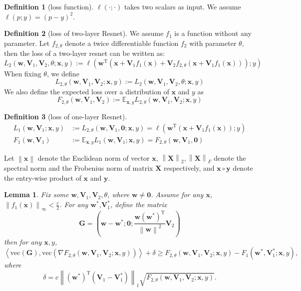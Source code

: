\documentclass{article}
\theoremstyle{plain}
\newtheorem{lem}{Lemma}
\theoremstyle{definition}
\newtheorem{defn}{Definition}
\newcommand{\norm}[1]{\left\lVert#1\right\rVert}
\newcommand{\iprod}[2]{\left\langle #1,#2 \right\rangle}
\begin{document}
\begin{defn}[loss function]
    $\ell(\cdot;\cdot)$ takes two scalars as input. We assume $\ell(p;y)=(p-y)^2$.
\end{defn}

\begin{defn}[loss of two-layer Resnet]
	We assume $f_1$ is a function without any parameter. Let $f_{2,\theta}$ denote a twice differentiable function $f_2$ with parameter $\theta$, then the loss of a two-layer resnet can be written as:
    \[L_2(\mathbf{w},\mathbf{V}_1,\mathbf{V}_2,\theta;\mathbf{x},y):=\ell\left(\mathbf{w}^\mathrm{T}(\mathbf{x}+\mathbf{V}_1f_1(\mathbf{x})+\mathbf{V}_2f_{2,\theta}(\mathbf{x}+\mathbf{V}_1f_1(\mathbf{x})));y\right)\]
	When fixing $\theta$, we define
	\[L_{2,\theta}(\mathbf{w},\mathbf{V}_1,\mathbf{V}_2;\mathbf{x},y):=L_2(\mathbf{w},\mathbf{V}_1,\mathbf{V}_2,\theta;\mathbf{x},y)\]
	We also define the expected loss over a distribution of $\mathbf{x}$ and $y$ as
	\[F_{2,\theta}(\mathbf{w},\mathbf{V}_1,\mathbf{V}_2):=\mathbb{E}_{\mathbf{x},y}L_{2,\theta}(\mathbf{w},\mathbf{V}_1,\mathbf{V}_2;\mathbf{x},y)\]
\end{defn}

\begin{defn}[loss of one-layer Resnet]
	\begin{align*}
        L_1(\mathbf{w},\mathbf{V}_1;\mathbf{x},y)&:=L_{2,\theta}(\mathbf{w},\mathbf{V}_1,\mathbf{0};\mathbf{x},y)=\ell\left(\mathbf{w}^\mathrm{T}(\mathbf{x}+\mathbf{V}_1f_1(\mathbf{x}));y\right)\\
	F_1(\mathbf{w},\mathbf{V}_1)&:=\mathbb{E}_{\mathbf{x},y}L_1(\mathbf{w},\mathbf{V}_1;\mathbf{x},y)=F_{2,\theta}(\mathbf{w},\mathbf{V}_1,\mathbf{0})
	\end{align*}
\end{defn}

\begin{flushleft}
	Let $\norm{\mathbf{x}}$ denote the Euclidean norm of vector $\mathbf{x}$, $\norm{\mathbf{X}}_2,\norm{\mathbf{X}}_F$ denote the spectral norm and the Frobenius norm of matrix $\mathbf{X}$ respectively, and $\mathbf{x}\circ\mathbf{y}$ denote the entry-wise product of $\mathbf{x}$ and $\mathbf{y}$.
\end{flushleft}

\begin{lem}
	Fix some $\mathbf{w},\mathbf{V}_1,\mathbf{V}_2,\theta$,
    where $\mathbf{w}\neq\mathbf{0}$.
    Assume for any $\mathbf{x}$, $\norm{f_1(\mathbf{x})}_\infty<\frac c 2$.
    For any $\mathbf{w}^*$,$\mathbf{V}_1^*$, define the matrix
    \[\mathbf{G}=
    \left(\mathbf{w}-\mathbf{w}^*;
    \mathbf{0};
    \frac{\mathbf{w}\left(\mathbf{w}^{*}\right)^\mathrm{T}}{\norm{\mathbf{w}}^2}\mathbf{V}_2\right)\]
	then for any $\mathbf{x},y$,
    \[\iprod{\text{vec}(\mathbf{G})}
    {\text{vec}\left(\nabla F_{2,\theta}(\mathbf{w},\mathbf{V}_1,\mathbf{V}_2;\mathbf{x},y)\right)}
    +\delta
    \geq F_{2,\theta}(\mathbf{w},\mathbf{V}_1,\mathbf{V}_2;\mathbf{x},y)
    -F_1(\mathbf{w}^*,\mathbf{V}_1^*;\mathbf{x},y),\]
    where
    \[\delta=c\norm{\left(\mathbf{w}^*\right)^\mathrm{T}\left(\mathbf{V}_1-\mathbf{V}_1^*\right)}_1
    \sqrt{F_{2,\theta}(\mathbf{w},\mathbf{V}_1,\mathbf{V}_2;\mathbf{x},y)}.\]
\end{lem}
\end{document}
